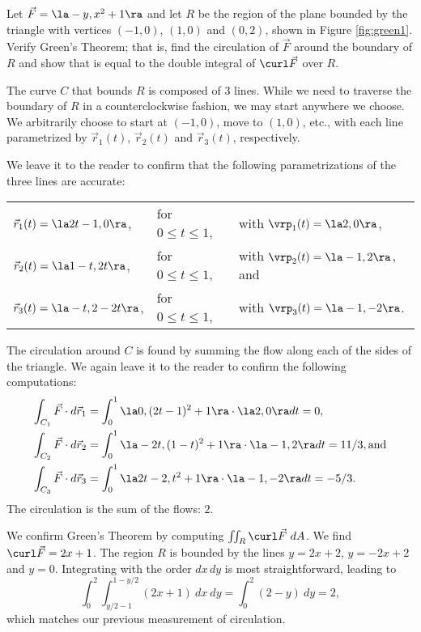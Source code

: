 {Let $\vec F =\la -y,x^2+1\ra$ and let $R$ be the region of the plane bounded by the triangle with vertices $(-1,0)$, $(1,0)$ and $(0,2)$, shown in Figure \ref{fig:green1}. Verify Green's Theorem; that is, find the circulation of $\vec F$ around the boundary of $R$ and show that is equal to the double integral of $\curl \vec F$ over $R$.
}
{The curve $C$ that bounds $R$ is composed of 3 lines. While we need to traverse the boundary of $R$ in a counterclockwise fashion, we may start anywhere we choose. We arbitrarily choose to start at $(-1,0)$, move to $(1,0)$, etc., with each line parametrized by $\vec r_1(t)$, $\vec r_2(t)$ and $\vec r_3(t)$, respectively.

We leave it to the reader to confirm that the following parametrizations of the three lines are accurate:

\begin{tabular}{lll}
$\vec r_1(t) = \la 2t-1,0\ra$,& for $0\leq t\leq 1$,& with $\vrp_1(t) = \la 2,0\ra$,\\
$\vec r_2(t) = \la 1-t,2t\ra$,& for $0\leq t\leq 1$,& with $\vrp_2(t) = \la -1,2\ra$, and\\
$\vec r_3(t) = \la -t,2-2t\ra$,& for $0\leq t\leq 1$,& with $\vrp_3(t) = \la -1,-2\ra$.
\end{tabular}

The circulation around $C$ is found by summing the flow along each of the sides of the triangle. We again leave it to the reader to confirm the following computations:
\begin{align*}
\int_{C_1}\vec F\cdot d\vec r_1 &= \int_0^1 \la 0,(2t-1)^2+1\ra\cdot \la 2,0\ra dt = 0,\\
\int_{C_2}\vec F\cdot d\vec r_2 &= \int_0^1 \la -2t,(1-t)^2+1\ra\cdot \la -1,2\ra dt = 11/3, \text{and}\\
\int_{C_3}\vec F\cdot d\vec r_3 &= \int_0^1 \la 2t-2,t^2+1\ra\cdot \la -1,-2\ra dt = -5/3.
\end{align*}
The circulation is the sum of the flows: $2$.

We confirm Green's Theorem by computing $\iint_R \curl \vec F\ dA$. We find $\curl \vec F = 2x+1$. The region $R$ is bounded by the lines $y = 2x+2$, $y=-2x+2$ and $y=0$. Integrating with the order $dx\, dy$ is most straightforward, leading to
\[
\int_0^2\int_{y/2-1}^{1-y/2} (2x+1)\ dx\ dy = \int_0^2 (2-y)\ dy = 2,
\]
which matches our previous measurement of circulation. 
}\\

